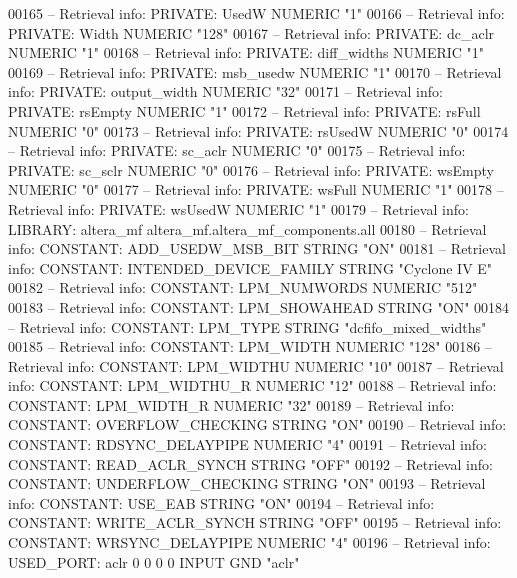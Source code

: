 \begin{DoxyCode}
{00165 \textcolor{keyword}{-- Retrieval info: PRIVATE: UsedW NUMERIC "1"}
00166 \textcolor{keyword}{-- Retrieval info: PRIVATE: Width NUMERIC "128"}
00167 \textcolor{keyword}{-- Retrieval info: PRIVATE: dc\_aclr NUMERIC "1"}
00168 \textcolor{keyword}{-- Retrieval info: PRIVATE: diff\_widths NUMERIC "1"}
00169 \textcolor{keyword}{-- Retrieval info: PRIVATE: msb\_usedw NUMERIC "1"}
00170 \textcolor{keyword}{-- Retrieval info: PRIVATE: output\_width NUMERIC "32"}
00171 \textcolor{keyword}{-- Retrieval info: PRIVATE: rsEmpty NUMERIC "1"}
00172 \textcolor{keyword}{-- Retrieval info: PRIVATE: rsFull NUMERIC "0"}
00173 \textcolor{keyword}{-- Retrieval info: PRIVATE: rsUsedW NUMERIC "0"}
00174 \textcolor{keyword}{-- Retrieval info: PRIVATE: sc\_aclr NUMERIC "0"}
00175 \textcolor{keyword}{-- Retrieval info: PRIVATE: sc\_sclr NUMERIC "0"}
00176 \textcolor{keyword}{-- Retrieval info: PRIVATE: wsEmpty NUMERIC "0"}
00177 \textcolor{keyword}{-- Retrieval info: PRIVATE: wsFull NUMERIC "1"}
00178 \textcolor{keyword}{-- Retrieval info: PRIVATE: wsUsedW NUMERIC "1"}
00179 \textcolor{keyword}{-- Retrieval info: LIBRARY: altera\_mf altera\_mf.altera\_mf\_components.all}
00180 \textcolor{keyword}{-- Retrieval info: CONSTANT: ADD\_USEDW\_MSB\_BIT STRING "ON"}
00181 \textcolor{keyword}{-- Retrieval info: CONSTANT: INTENDED\_DEVICE\_FAMILY STRING "Cyclone IV E"}
00182 \textcolor{keyword}{-- Retrieval info: CONSTANT: LPM\_NUMWORDS NUMERIC "512"}
00183 \textcolor{keyword}{-- Retrieval info: CONSTANT: LPM\_SHOWAHEAD STRING "ON"}
00184 \textcolor{keyword}{-- Retrieval info: CONSTANT: LPM\_TYPE STRING "dcfifo\_mixed\_widths"}
00185 \textcolor{keyword}{-- Retrieval info: CONSTANT: LPM\_WIDTH NUMERIC "128"}
00186 \textcolor{keyword}{-- Retrieval info: CONSTANT: LPM\_WIDTHU NUMERIC "10"}
00187 \textcolor{keyword}{-- Retrieval info: CONSTANT: LPM\_WIDTHU\_R NUMERIC "12"}
00188 \textcolor{keyword}{-- Retrieval info: CONSTANT: LPM\_WIDTH\_R NUMERIC "32"}
00189 \textcolor{keyword}{-- Retrieval info: CONSTANT: OVERFLOW\_CHECKING STRING "ON"}
00190 \textcolor{keyword}{-- Retrieval info: CONSTANT: RDSYNC\_DELAYPIPE NUMERIC "4"}
00191 \textcolor{keyword}{-- Retrieval info: CONSTANT: READ\_ACLR\_SYNCH STRING "OFF"}
00192 \textcolor{keyword}{-- Retrieval info: CONSTANT: UNDERFLOW\_CHECKING STRING "ON"}
00193 \textcolor{keyword}{-- Retrieval info: CONSTANT: USE\_EAB STRING "ON"}
00194 \textcolor{keyword}{-- Retrieval info: CONSTANT: WRITE\_ACLR\_SYNCH STRING "OFF"}
00195 \textcolor{keyword}{-- Retrieval info: CONSTANT: WRSYNC\_DELAYPIPE NUMERIC "4"}
00196 \textcolor{keyword}{-- Retrieval info: USED\_PORT: aclr 0 0 0 0 INPUT GND "aclr"}
}
\end{DoxyCode}
